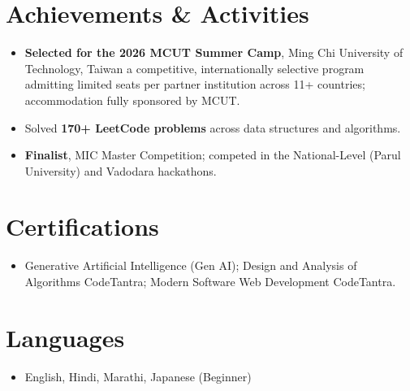 \documentclass[letterpaper,11pt]{article}
\newcommand{\resumeItem}[1]{
  \item\small{
        {#1 \vspace{-1pt}}
  }
}
\begin{document}
\section{Achievements \& Activities}
 \begin{itemize}[leftmargin=0.15in, label={}, itemsep=2pt, parsep=0pt]
      \resumeItem{\textbf{Selected for the 2026 MCUT Summer Camp}, Ming Chi University of Technology, Taiwan \textemdash{} a competitive, internationally selective program admitting limited seats per partner institution across 11+ countries; accommodation fully sponsored by MCUT.}
      \resumeItem{Solved \textbf{170+ LeetCode problems} across data structures and algorithms.}
      \resumeItem{\textbf{Finalist}, MIC Master Competition; competed in the National-Level (Parul University) and Vadodara hackathons.}
 \end{itemize}

\section{Certifications}
 \begin{itemize}[leftmargin=0.15in, label={}, itemsep=2pt, parsep=0pt]
      \resumeItem{Generative Artificial Intelligence (Gen AI); Design and Analysis of Algorithms \textemdash{} CodeTantra; Modern Software Web Development \textemdash{} CodeTantra.}
 \end{itemize}

\section{Languages}
 \begin{itemize}[leftmargin=0.15in, label={}, itemsep=2pt, parsep=0pt]
      \resumeItem{English, Hindi, Marathi, Japanese (Beginner)}
 \end{itemize}
\end{document}
